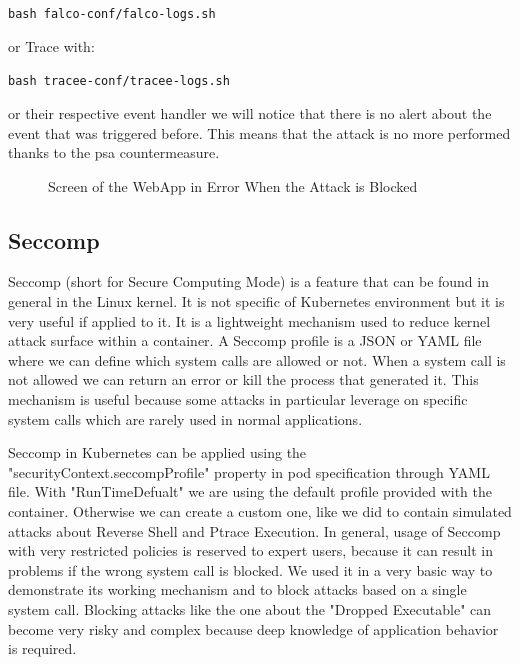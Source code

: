 \texttt{bash falco-conf/falco-logs.sh}

\noindent or Trace with:

\texttt{bash tracee-conf/tracee-logs.sh}

\noindent or their respective event handler we will notice that there is no alert about the event that was triggered before. This means that the attack is no more performed thanks to the \ac{psa} countermeasure.

\begin{figure}[H]
    \centering
    \caption{Screen of the WebApp in Error When the Attack is Blocked}
    \label{fig:error}
\end{figure}


\subsection{Seccomp}
Seccomp (short for Secure Computing Mode) is a feature that can be found in general in the Linux kernel. It is not specific of Kubernetes environment but it is very useful if applied to it. It is a lightweight mechanism used to reduce kernel attack surface within a container. A Seccomp profile is a JSON or YAML file where we can define which system calls are allowed or not. When a system call is not allowed we can return an error or kill the process that generated it. This mechanism is useful because some attacks in particular leverage on specific system calls which are rarely used in normal applications.

Seccomp in Kubernetes can be applied using the "securityContext.seccompProfile" property in pod specification through YAML file. With "RunTimeDefualt" we are using the default profile provided with the container. Otherwise we can create a custom one, like we did to contain simulated attacks about Reverse Shell and Ptrace Execution. In general, usage of Seccomp with very restricted policies is reserved to expert users, because it can result in problems if the wrong system call is blocked. We used it in a very basic way to demonstrate its working mechanism and to block attacks based on a single system call. Blocking attacks like the one about the "Dropped Executable" can become very risky and complex because deep knowledge of application behavior is required.

